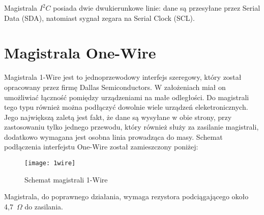 Magistrala $I^{2}C$ posiada dwie dwukierunkowe linie: dane są przesyłane przez Serial Data (SDA), natomiast sygnał zegara na Serial Clock (SCL). 

\section{Magistrala One-Wire}

Magistrala 1-Wire jest to jednoprzewodowy interfejs szeregowy, który został opracowany przez firmę Dallas Semiconductors. W założeniach miał on umożliwiać łączność pomiędzy urządzeniami na małe odległości. Do magistrali tego typu również można podłączyć dowolnie wiele urządzeń eleketronicznych. Jego największą zaletą jest fakt, że dane są wysyłane w obie strony, przy zastosowaniu tylko jednego przewodu, który również służy za zasilanie magistrali, dodatkowo wymagana jest osobna linia prowadząca do masy. Schemat podłączenia interfejstu One-Wire został zamieszczony poniżej:
\begin{figure}[h]
\centering
\texttt{[image: 1wire]}
\caption{Schemat magistrali 1-Wire}
\label{fig:1wire}
\end{figure}

Magistrala, do poprawnego działania, wymaga rezystora podciągającego około 4,7~$\Omega$ do zasilania.